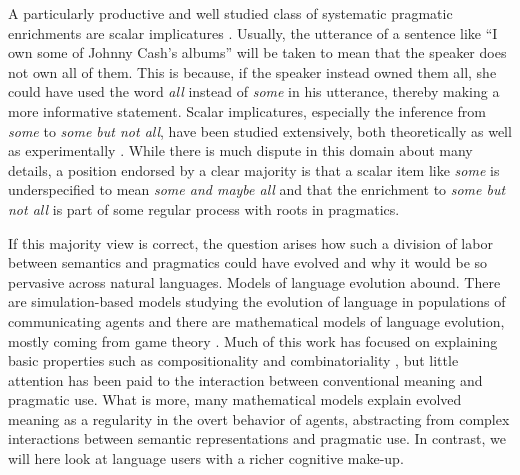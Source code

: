\documentclass[a4paper, 11pt]{article}
\theoremstyle{Satz}
\begin{document}
A particularly productive and well studied class of systematic pragmatic enrichments are scalar
implicatures
\citep{horn:1984,Hirschberg1985:A-Theory-of-Sca,LevinsonPragmatics1983,Geurts2010:Quantity-Implic}. Usually,
the utterance of a sentence like ``I own some of Johnny Cash's albums'' will be taken to mean
that the speaker does not own all of them. This is because, if the speaker instead owned them all, she
could have used the word \emph{all} instead of \emph{some} in his utterance, thereby making a
more informative statement. Scalar implicatures, especially the inference from \emph{some} to
\emph{some but not all}, have been studied extensively, both theoretically
\citep[e.g.,][]{Sauerland2004:Scalar-Implicat,ChierchiaFox2008:The-Grammatical,Rooyvan-RooijJagerde-Jager2012:Explaining-Quan}
as well as experimentally
\citep[e.g.,][]{BottNoveck2004:Some-Utterances,huang+snedeker:2009,GrodnerKlein2010:Some-and-Possib,GoodmanStuhlmuller2013:Knowledge-and-I,DegenTanenhaus2012:Processing-Scal}. While
there is much dispute in this domain about many details, a position endorsed by a clear
majority is that a scalar item like \emph{some} is underspecified to mean \emph{some and maybe
  all} and that the enrichment to \emph{some but not all} is part of some regular process with
roots in pragmatics.

If this majority view is correct, the question arises how such a division of labor between
semantics and pragmatics could have evolved and why it would be so pervasive across natural
languages. Models of language evolution abound. There are simulation-based models studying the
evolution of language in populations of communicating agents
\citep{Hurford1989:Biological-Evol,Steels1995:A-Self-Organizi,LenaertsJansen2005:The-Evolutionar,SteelsBelpaeme2005:Coordinating-Pe,BaronchelliPuglisi2008:Cultural-route-,steels:2011,SpikeStadler2016:Minimal-Require}
and there are mathematical models of language evolution, mostly coming from game theory
\citep{lewis:1969,Warneryd1993:Cheap-Talk-Coor,BlumeKim1993:Evolutionary-St,nowak+krakauer:1999,Huttegger2007:Evolution-and-t,Skyrms2010:Signals}. Much
of this work has focused on explaining basic properties such as compositionality and
combinatoriality
\citep[e.g.,][]{Batali1998:Computational-S,nowak+krakauer:1999,nowak+etal:2000,KirbyHurford2002:The-Emergence-o,kirby:2002,SmithKirby2003:Iterated-Learni,Gong2007:Language-Evolut,kirby+etal:2015,verhoef+etal:2014,Franke2015:Proto-Syntax},
but little attention has been paid to the interaction between conventional meaning and
pragmatic use. What is more, many mathematical models explain evolved meaning as a regularity
in the overt behavior of agents, abstracting from complex interactions between semantic representations and pragmatic use. In contrast, we will here look at language users with a richer
cognitive make-up.
\end{document}
